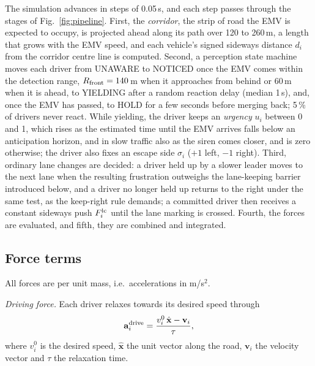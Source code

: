 \documentclass[conference,a4paper]{IEEEtran}
\begin{document}
The simulation advances in steps of 0.05\,s, and each step passes through the stages of Fig.~\ref{fig:pipeline}. First, the \emph{corridor}, the strip of road the EMV is expected to occupy, is projected ahead along its path over 120 to 260\,m, a length that grows with the EMV speed, and each vehicle's signed sideways distance $d_i$ from the corridor centre line is computed. Second, a perception state machine moves each driver from UNAWARE to NOTICED once the EMV comes within the detection range, $R_{\rm front}=140$\,m when it approaches from behind or 60\,m when it is ahead, to YIELDING after a random reaction delay (median 1\,s), and, once the EMV has passed, to HOLD for a few seconds before merging back; 5\,\% of drivers never react. While yielding, the driver keeps an \emph{urgency} $u_i$ between 0 and 1, which rises as the estimated time until the EMV arrives falls below an anticipation horizon, and in slow traffic also as the siren comes closer, and is zero otherwise; the driver also fixes an escape side $\sigma_i$ ($+1$ left, $-1$ right). Third, ordinary lane changes are decided: a driver held up by a slower leader moves to the next lane when the resulting frustration outweighs the lane-keeping barrier introduced below, and a driver no longer held up returns to the right under the same test, as the keep-right rule demands; a committed driver then receives a constant sideways push $F^{\rm lc}_i$ until the lane marking is crossed. Fourth, the forces are evaluated, and fifth, they are combined and integrated.

\subsection{Force terms}
All forces are per unit mass, i.e.\ accelerations in m/s$^2$.

\emph{Driving force.} Each driver relaxes towards its desired speed through
\begin{equation}
\mathbf a^{\rm drive}_i=\frac{v^0_i\,\hat{\mathbf x}-\mathbf v_i}{\tau},
\label{eq:drive}
\end{equation}
where $v^0_i$ is the desired speed, $\hat{\mathbf x}$ the unit vector along the road, $\mathbf v_i$ the velocity vector and $\tau$ the relaxation time.
\end{document}
